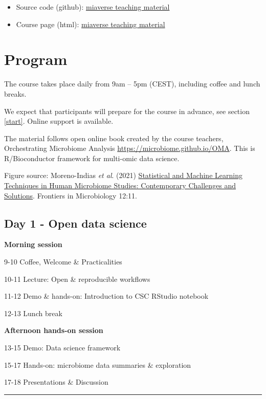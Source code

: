 \documentclass[
  oneside]{book}
\providecommand{\tightlist}{%
  \setlength{\itemsep}{0pt}\setlength{\parskip}{0pt}}
\begin{document}
\begin{itemize}
\tightlist
\item
  Source code (github): \href{https://github.com/microbiome/course_2022_oulu}{miaverse teaching material}
\item
  Course page (html): \href{https://microbiome.github.io/course_2022_oulu/}{miaverse teaching material}
\end{itemize}

\hypertarget{program}{%
\chapter{Program}\label{program}}

The course takes place daily from 9am -- 5pm (CEST), including
coffee and lunch breaks.

We expect that participants will prepare for the course in advance, see section
\ref{start}. Online support is available.

The material follows open online book created by the course teachers,
Orchestrating Microbiome Analysis
\url{https://microbiome.github.io/OMA}. This is R/Bioconductor framework for
multi-omic data science.

Figure source: Moreno-Indias \emph{et al}. (2021) \href{https://doi.org/10.3389/fmicb.2021.635781}{Statistical and Machine Learning Techniques in Human Microbiome Studies: Contemporary Challenges and Solutions}. Frontiers in Microbiology 12:11.

\hypertarget{day-1---open-data-science}{%
\section{Day 1 - Open data science}\label{day-1---open-data-science}}

\textbf{Morning session}

9-10 Coffee, Welcome \& Practicalities

10-11 Lecture: Open \& reproducible workflows

11-12 Demo \& hands-on: Introduction to CSC RStudio notebook

12-13 Lunch break

\textbf{Afternoon hands-on session}

13-15 Demo: Data science framework

15-17 Hands-on: microbiome data summaries \& exploration

17-18 Presentations \& Discussion

\begin{center}\rule{0.5\linewidth}{0.5pt}\end{center}
\end{document}
